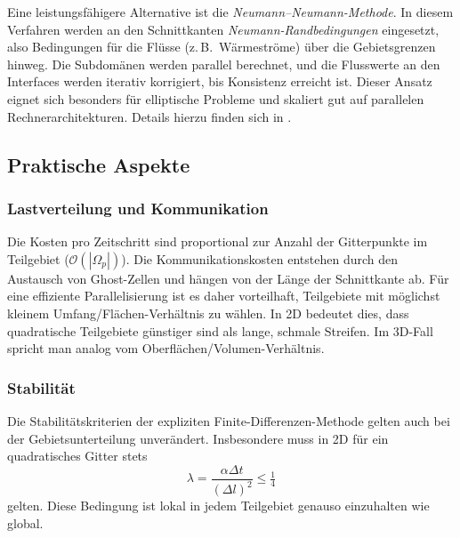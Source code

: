 \begin{itemize}
	Eine leistungsfähigere Alternative ist die \emph{Neumann--Neumann-Methode}.  
	In diesem Verfahren werden an den Schnittkanten \emph{Neumann-Randbedingungen} eingesetzt, also Bedingungen für die Flüsse (z.\,B.\ Wärmeströme) über die Gebietsgrenzen hinweg.  
	Die Subdomänen werden parallel berechnet, und die Flusswerte an den Interfaces werden iterativ korrigiert, bis Konsistenz erreicht ist.  
	Dieser Ansatz eignet sich besonders für elliptische Probleme und skaliert gut auf parallelen Rechnerarchitekturen.  
	Details hierzu finden sich in \cite{parallelisierung:gander2019}.
\end{itemize}


\subsection{Praktische Aspekte}

\subsubsection {Lastverteilung und Kommunikation}
Die Kosten pro Zeitschritt sind proportional zur Anzahl der Gitterpunkte im Teilgebiet 
($\mathcal{O}(|\Omega_p|)$).  
Die Kommunikationskosten entstehen durch den Austausch von Ghost-Zellen und hängen von der Länge der Schnittkante ab.  
Für eine effiziente Parallelisierung ist es daher vorteilhaft, Teilgebiete mit möglichst kleinem 
Umfang/Flächen-Verhältnis zu wählen.  
In 2D bedeutet dies, dass quadratische Teilgebiete günstiger sind als lange, schmale Streifen.
Im 3D-Fall spricht man analog vom Oberflächen/Volumen-Verhältnis.  

\subsubsection {Stabilität}
Die Stabilitätskriterien der expliziten Finite-Differenzen-Methode gelten auch bei der Gebietsunterteilung unverändert.  
Insbesondere muss in 2D für ein quadratisches Gitter stets
\[
\lambda = \frac{\alpha \Delta t}{(\Delta l)^2} \leq \tfrac{1}{4}
\]
gelten.  
Diese Bedingung ist lokal in jedem Teilgebiet genauso einzuhalten wie global. 

